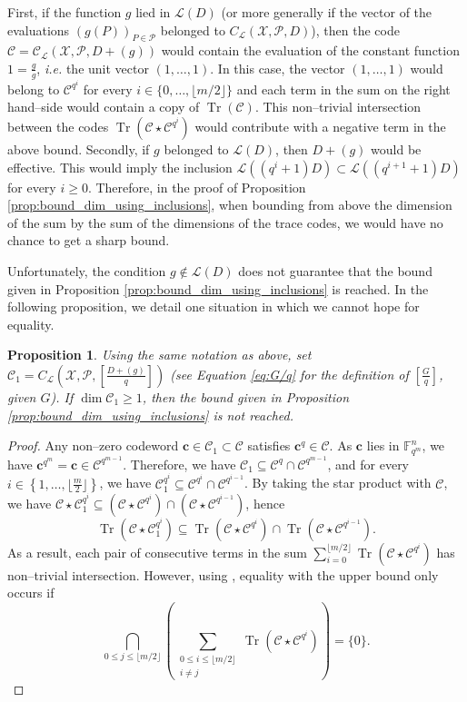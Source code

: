 \documentclass[lettersize,journal]{IEEEtran}
\theoremstyle{plain}
\newtheorem{proposition}[thm]{Proposition}
\theoremstyle{definition}
\theoremstyle{remark}
\DeclareMathOperator{\trace}{Tr}
\newcommand{\calP}{\mathcal{P}}
\newcommand{\calL}{\mathcal{L}}
\newcommand{\calC}{\mathcal{C}}
\newcommand{\calX}{\mathcal{X}}
\newcommand{\fqm}{\mathbb{F}_{q^m}}
\newcommand{\Tr}[1]{\trace\!\left(#1\right)}
\newcommand{\set}[1]{\left\{#1\right\}}
\begin{document}
	First, if the function $g$ lied in $\calL(D)$ (or more generally if the vector of the evaluations $(g(P))_{P \in \calP}$ belonged to $C_\calL(\calX,\calP,D)$), then the code $\calC= \calC_{\calL}(\calX,\calP,D+(g))$ would contain the evaluation of the constant function $1=\frac{g}{g}$, \textit{i.e.} the unit vector $(1,\dots,1)$. In this case, the vector $(1,\dots,1)$ would belong to $\calC^{q^i}$ for every $i \in \{0,\dots, \lfloor{m/2} \rfloor\}$ and each term in the sum on the right hand--side would contain a copy of $\Tr{\calC}$. This non--trivial intersection between the codes $\Tr{\calC\star \calC^{q^i}}$ would contribute with a negative term in the above bound.
	Secondly, if $g$ belonged to $\calL(D)$, then $D+(g)$ would be effective. This would imply the inclusion $\calL((q^i+1)D) \subset \calL((q^{i+1}+1)D)$ for every $i \geq 0$. Therefore, in the proof of Proposition \ref{prop:bound_dim_using_inclusions}, when bounding from above the dimension of the sum by the sum of the dimensions of the trace codes, we would have no chance to get a sharp bound.
	
	Unfortunately, the condition $g \notin \calL(D)$ does not guarantee that the bound given in Proposition \ref{prop:bound_dim_using_inclusions} is reached. In the following proposition, we detail one situation in which we cannot hope for equality.
	
	\begin{proposition}\label{prop:non-eq}
		Using the same notation as above, set $\calC_1=C_{\calL}\left(\calX,\mathcal{P},\left[ \frac{D+(g)}{q} \right]\right)$ (see Equation \eqref{eq:G/q} for the definition of $\left[ \frac{G}{q} \right]$, given $G$). If $\dim \calC_1 \geq 1$, then the bound given in Proposition \ref{prop:bound_dim_using_inclusions} is not reached.
	\end{proposition}
	
	\begin{proof}
		Any non--zero codeword $\mathbf{c} \in  \calC_1 \subset \calC$ satisfies $\mathbf{c}^q \in \calC$. As $\mathbf{c}$ lies in $\fqm^n$, we have $\mathbf{c}^{q^m}=\mathbf{c} \in \calC^{q^{m-1}}$. Therefore,  we have $\calC_1 \subseteq \calC^{q} \cap \calC^{q^{m-1}}$, and for every $i \in \set{1,\dots,\lfloor \frac{m}{2}\rfloor}$, we have $\calC_1^{q^i} \subseteq \calC^{q^i} \cap \calC^{q^{i-1}}$. By taking the star product with $\calC$, we have $\calC \star \calC_1^{q^i} \subseteq \left(\calC \star  \calC^{q^i}\right) \cap \left(\calC \star  \calC^{q^{i-1}}\right)$, hence
		\[\Tr{\calC\star\calC_1^{q^i}} \subseteq \Tr{\calC\star\calC^{q^i}} \cap \Tr{\calC\star\calC^{q^{i-1}}}.\]
		As a result, each pair of consecutive terms in the sum $\sum\limits_{i=0}^{\lfloor m/2 \rfloor} \Tr{\calC \star \calC^{q^i}}$ has non--trivial intersection. However, using \cite[Theorem~2]{T19}, equality with the upper bound only occurs if
		\[\bigcap_{0\leq j \leq \lfloor m/2\rfloor} \left( \sum_{\substack{0\leq i \leq \lfloor m/2 \rfloor\\ i\neq j}} \Tr{\calC \star \calC^{q^i}} \right)= \{0\}.\]
	\end{proof}
	
\end{document}
